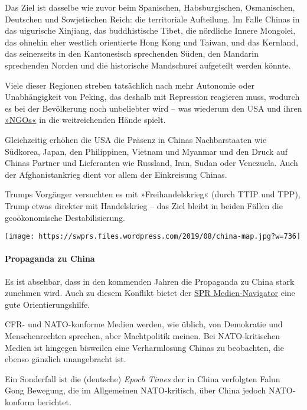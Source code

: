 Das Ziel ist dasselbe wie zuvor beim Spanischen, Habsburgischen,
Osmanischen, Deutschen und Sowjetischen Reich: die territoriale
Aufteilung. Im Falle Chinas in das uigurische Xinjiang, das
buddhistische Tibet, die nördliche Innere Mongolei, das ohnehin eher
westlich orientierte Hong Kong und Taiwan, und das Kernland, das
seinerseits in den Kantonesisch sprechenden Süden, den Mandarin
sprechenden Norden und die historische Mandschurei aufgeteilt werden
könnte.

Viele dieser Regionen streben tatsächlich nach mehr Autonomie oder
Unabhängigkeit von Peking, das deshalb mit Repression reagieren muss,
wodurch es bei der Bevölkerung noch unbeliebter wird -- was wiederum den
USA und ihren
\href{https://swprs.org/organizations-funded-by-the-ned/}{»NGOs«} in die
weitreichenden Hände spielt.

Gleichzeitig erhöhen die USA die Präsenz in Chinas Nachbarstaaten wie
Südkorea, Japan, den Philippinen, Vietnam und Myanmar und den Druck auf
Chinas Partner und Lieferanten wie Russland, Iran, Sudan oder Venezuela.
Auch der Afghanistankrieg dient vor allem der Einkreisung Chinas.

Trumps Vorgänger versuchten es mit »Freihandelskrieg« (durch TTIP und
TPP), Trump etwas direkter mit Handelskrieg -- das Ziel bleibt in beiden
Fällen die geoökonomische Destabilisierung.

\texttt{[image: https://swprs.files.wordpress.com/2019/08/china-map.jpg?w=736]}

\hypertarget{propaganda-zu-china}{%
\paragraph{Propaganda zu China}\label{propaganda-zu-china}}

Es ist absehbar, dass in den kommenden Jahren die Propaganda zu China
stark zunehmen wird. Auch zu diesem Konflikt bietet der
\href{https://swprs.org/medien-navigator/}{SPR Medien-Navigator} eine
gute Orientierungshilfe.

CFR- und NATO-konforme Medien werden, wie üblich, von Demokratie und
Menschen­rechten sprechen, aber Machtpolitik meinen. Bei NATO-kritischen
Medien ist hingegen bisweilen eine Verharmlosung Chinas zu beobachten,
die ebenso gänzlich unangebracht ist.

Ein Sonderfall ist die (deutsche) \emph{Epoch Times} der in China
verfolgten Falun Gong Bewegung, die im Allgemeinen NATO-kritisch, über
China jedoch NATO-konform berichtet.

